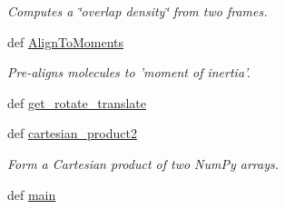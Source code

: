 \begin{DoxyCompactItemize}
\begin{DoxyCompactList}\small\item\em Computes a \char`\"{}overlap density\char`\"{} from two frames. \end{DoxyCompactList}\item 
def \hyperlink{namespaceforcebalance_1_1molecule_aa9ad9b92efa7bd3c1d589d62bbb8108e}{Align\-To\-Moments}
\begin{DoxyCompactList}\small\item\em Pre-\/aligns molecules to 'moment of inertia'. \end{DoxyCompactList}\item 
def \hyperlink{namespaceforcebalance_1_1molecule_a08840b73e95bf34bf9ca7ea36ad0492d}{get\-\_\-rotate\-\_\-translate}
\item 
def \hyperlink{namespaceforcebalance_1_1molecule_ae76fc5d05f43acc6006a4d1733818d71}{cartesian\-\_\-product2}
\begin{DoxyCompactList}\small\item\em Form a Cartesian product of two Num\-Py arrays. \end{DoxyCompactList}\item 
def \hyperlink{namespaceforcebalance_1_1molecule_ab9cb167fbbd809aedcf8c7434d405547}{main}
\end{DoxyCompactItemize}
